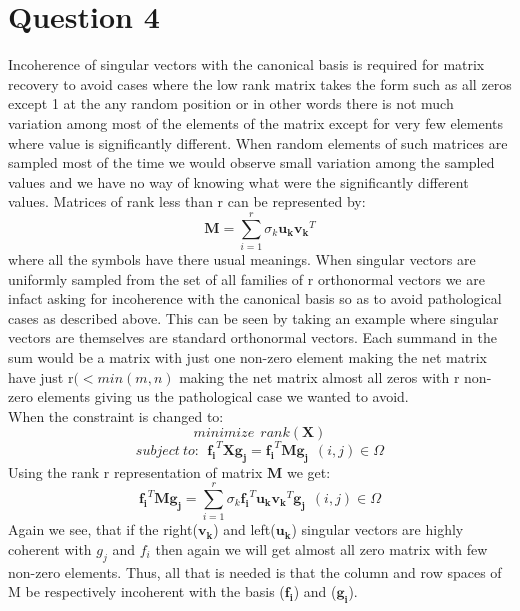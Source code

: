 \documentclass[12pt]{article}
\begin{document}
\section*{Question 4}
Incoherence of singular vectors with the canonical basis is required for matrix recovery to avoid cases where the low rank matrix takes the form such as all zeros except 1 at the any random position or in other words there is not much variation among most of the elements of the matrix except for very few elements where value is significantly different. When random elements of such matrices are sampled most of the time we would observe small variation among the sampled values and we have no way of knowing what were the significantly different values. Matrices of rank less than r can be represented by:
\begin{equation*}
	\boldsymbol{M} = \sum_{i=1}^{r}\sigma_k\boldsymbol{u_k}\boldsymbol{v_k}^T
\end{equation*}
where all the symbols have there usual meanings. When singular vectors are uniformly sampled from the set of all families of r orthonormal vectors we are infact asking for incoherence with the canonical basis so as to avoid pathological cases as described above. This can be seen by taking an example where singular vectors are themselves are standard orthonormal vectors. Each summand in the sum would be a matrix with just one non-zero element making the net matrix have just r$(<min(m,n)$ making the net matrix almost all zeros with r non-zero elements giving us the pathological case we wanted to avoid.\\
When the constraint is changed to:
\begin{equation*}
	minimize \ \ rank(\boldsymbol{X})
\end{equation*}
\begin{equation*}
	subject \ to: \ \ \boldsymbol{f_i}^T\boldsymbol{X}\boldsymbol{g_j} = \boldsymbol{f_i}^T\boldsymbol{M}\boldsymbol{g_j} \ \ (i,j) \in \Omega
\end{equation*}
Using the rank r representation of matrix $\boldsymbol{M}$ we get:
\begin{equation*}
	\boldsymbol{f_i}^T\boldsymbol{M}\boldsymbol{g_j} = \sum_{i=1}^{r}\sigma_k\boldsymbol{f_i}^T\boldsymbol{u_k}\boldsymbol{v_k}^T\boldsymbol{g_j} \ \ (i,j) \in \Omega
\end{equation*}
Again we see, that if the right($\boldsymbol{v_k}$) and left($\boldsymbol{u_k}$) singular vectors are highly coherent with $g_j$ and $f_i$ then again we will get almost all zero matrix with few non-zero elements. Thus, all that is needed is that the column and row spaces of M be respectively incoherent with the basis ($\boldsymbol{f_i}$) and ($\boldsymbol{g_i}$).
\end{document}
